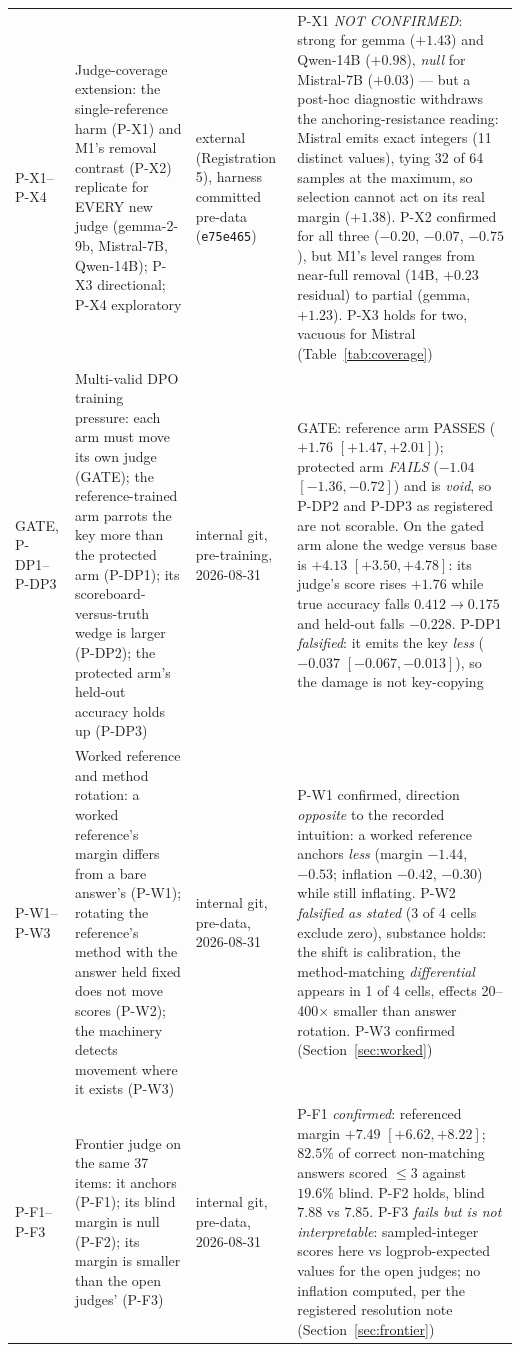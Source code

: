 \documentclass[11pt]{article}
\begin{document}
\begin{longtable}{L{1.7cm}L{5.3cm}L{2.5cm}L{5.1cm}}
\addlinespace[1pt]
P-X1--P-X4 & Judge-coverage extension: the single-reference harm (P-X1) and M1's removal contrast (P-X2) replicate for EVERY new judge (gemma-2-9b, Mistral-7B, Qwen-14B); P-X3 directional; P-X4 exploratory & external (Registration 5), harness committed pre-data (\texttt{e75e465}) & P-X1 \emph{NOT CONFIRMED}: strong for gemma ($+1.43$) and Qwen-14B ($+0.98$), \emph{null} for Mistral-7B ($+0.03$) --- but a post-hoc diagnostic withdraws the anchoring-resistance reading: Mistral emits exact integers (11 distinct values), tying 32 of 64 samples at the maximum, so selection cannot act on its real margin ($+1.38$). P-X2 confirmed for all three ($-0.20$, $-0.07$, $-0.75$), but M1's level ranges from near-full removal (14B, $+0.23$ residual) to partial (gemma, $+1.23$). P-X3 holds for two, vacuous for Mistral (Table~\ref{tab:coverage}) \\
\addlinespace[1pt]
GATE, P-DP1--P-DP3 & Multi-valid DPO training pressure: each arm must move its own judge (GATE); the reference-trained arm parrots the key more than the protected arm (P-DP1); its scoreboard-versus-truth wedge is larger (P-DP2); the protected arm's held-out accuracy holds up (P-DP3) & internal git, pre-training, 2026-08-31 & GATE: reference arm PASSES ($+1.76$ $[+1.47,+2.01]$); protected arm \emph{FAILS} ($-1.04$ $[-1.36,-0.72]$) and is \emph{void}, so P-DP2 and P-DP3 as registered are not scorable. On the gated arm alone the wedge versus base is $+4.13$ $[+3.50,+4.78]$: its judge's score rises $+1.76$ while true accuracy falls $0.412 \to 0.175$ and held-out falls $-0.228$. P-DP1 \emph{falsified}: it emits the key \emph{less} ($-0.037$ $[-0.067,-0.013]$), so the damage is not key-copying \\
\addlinespace[1pt]
P-W1--P-W3 & Worked reference and method rotation: a worked reference's margin differs from a bare answer's (P-W1); rotating the reference's method with the answer held fixed does not move scores (P-W2); the machinery detects movement where it exists (P-W3) & internal git, pre-data, 2026-08-31 & P-W1 confirmed, direction \emph{opposite} to the recorded intuition: a worked reference anchors \emph{less} (margin $-1.44$, $-0.53$; inflation $-0.42$, $-0.30$) while still inflating. P-W2 \emph{falsified as stated} (3 of 4 cells exclude zero), substance holds: the shift is calibration, the method-matching \emph{differential} appears in 1 of 4 cells, effects 20--400$\times$ smaller than answer rotation. P-W3 confirmed (Section~\ref{sec:worked}) \\
\addlinespace[1pt]
P-F1--P-F3 & Frontier judge on the same 37 items: it anchors (P-F1); its blind margin is null (P-F2); its margin is smaller than the open judges' (P-F3) & internal git, pre-data, 2026-08-31 & P-F1 \emph{confirmed}: referenced margin $+7.49$ $[+6.62,+8.22]$; $82.5\%$ of correct non-matching answers scored $\leq 3$ against $19.6\%$ blind. P-F2 holds, blind $7.88$ vs $7.85$. P-F3 \emph{fails but is not interpretable}: sampled-integer scores here vs logprob-expected values for the open judges; no inflation computed, per the registered resolution note (Section~\ref{sec:frontier}) \\

\end{longtable}
\end{document}

